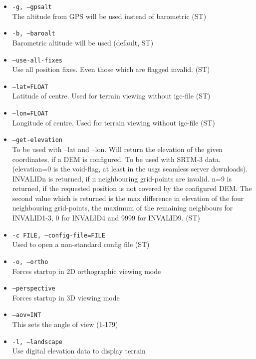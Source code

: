 \begin{itemize}
\item \texttt{-g, --gpsalt} \\
The altitude from GPS will be used instead of barometric (ST)

\item \texttt{-b, --baroalt} \\
Barometric altitude will be used (default, ST)

\item \texttt{--use-all-fixes} \\
Use all position fixes. Even those which are flagged invalid. (ST)

\item \texttt{--lat=FLOAT} \\
Latitude of centre. Used for terrain viewing without igc-file (ST)

\item \texttt{--lon=FLOAT} \\
Longitude of centre. Used for terrain viewing without igc-file (ST)

\item \texttt{--get-elevation} \\
To be used with --lat and --lon. Will return the elevation of the given coordinates,
if a DEM is configured. To be used with SRTM-3 data. (elevation=0 is the void-flag, at least in the usgs seamless server downloads).
INVALIDn is returned, if n neighbouring grid-points are invalid. n=9 is returned, if the requested
position is not covered by the configured DEM.
The second value which is returned is the max difference in elevation of the four neighbouring grid-points, the maximum of the remaining
neighbours for INVALID1-3, 0 for INVALID4 and 9999 for INVALID9. (ST)


\item \texttt{-c FILE, --config-file=FILE} \\
Used to open a non-standard config file (ST)

\item \texttt{-o, --ortho} \\
Forces startup in 2D orthographic viewing mode

\item \texttt{--perspective} \\
Forces startup in  3D viewing mode

\item \texttt{--aov=INT} \\
This sets the angle of view (1-179)

\item \texttt{-l, --landscape} \\
Use digital elevation data to display terrain


\end{itemize}
